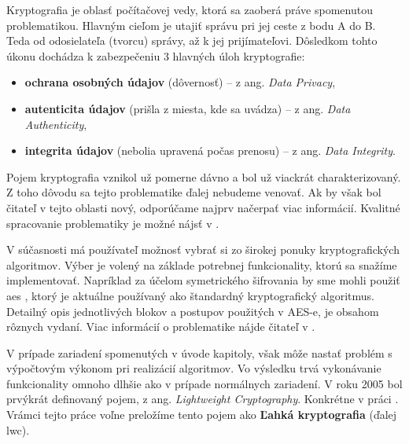 Kryptografia je oblasť počítačovej vedy, ktorá sa zaoberá práve spomenutou problematikou. Hlavným cieľom je utajiť správu pri jej ceste z bodu A do B. Teda od odosielateľa (tvorcu) správy, až k jej prijímateľovi. Dôsledkom tohto úkonu dochádza k zabezpečeniu 3 hlavných úloh kryptografie:
\begin{itemize}
	\item \textbf{ochrana osobných údajov} (dôvernosť) -- z ang. \textit{Data Privacy}, 
	\item \textbf{autenticita údajov} (prišla z miesta, kde sa uvádza)  -- z ang. \textit{Data Authenticity},
	\item \textbf{integrita údajov} (nebolia upravená počas prenosu)  -- z ang. \textit{Data Integrity}.
\end{itemize} 
Pojem kryptografia vznikol už pomerne dávno a bol už viackrát charakterizovaný. Z toho dôvodu sa tejto problematike ďalej nebudeme venovať. Ak by však bol čitateľ v tejto oblasti nový, odporúčame najprv načerpať viac informácií. Kvalitné spracovanie problematiky je možné nájsť v \cite{levicky}. 

V súčasnosti má používateľ možnosť vybrať si zo širokej ponuky kryptografických algoritmov. Výber je volený na základe potrebnej funkcionality, ktorú sa snažíme implementovať. Napríklad za účelom symetrického šifrovania by sme mohli použiť \acrshort{aes} \cite{aes}, ktorý je aktuálne používaný ako štandardný kryptografický algoritmus. Detailný opis jednotlivých blokov a postupov použitých v AES-e, je obsahom rôznych vydaní. Viac informácií o problematike nájde čitateľ v \cite{levicky}.

V prípade zariadení spomenutých v úvode kapitoly, však môže nastať problém s výpočtovým výkonom pri realizácií algoritmov. Vo výsledku trvá vykonávanie funkcionality omnoho dlhšie ako v prípade normálnych zariadení. V roku 2005 bol prvýkrát definovaný pojem, z ang. \textit{Lightweight Cryptography}. Konkrétne v práci \cite{lwc}. Vrámci tejto práce voľne preložíme tento pojem ako \textbf{Ľahká kryptografia} (ďalej \acrshort{lwc}). 


